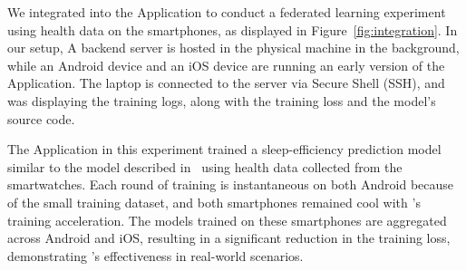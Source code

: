 We integrated \fedkit into the \fedcampus Application to
conduct a federated learning experiment using health data on the smartphones,
as displayed in Figure~\ref{fig:integration}.
In our setup,
A backend server is hosted in the physical machine in the background,
while an Android device and an iOS device are running an early version of
the \fedcampus Application.
The laptop is connected to the server via Secure Shell (SSH),
and was displaying the training logs,
along with the training loss and the model's source code.

The \fedcampus Application in this experiment trained a sleep-efficiency
prediction model similar to the model described in~\cite{khoa2022fedmcrnn}
using health data collected from the smartwatches.
Each round of training is instantaneous on both Android because of
the small training dataset,
and both smartphones remained cool with \fedkit's training acceleration.
The models trained on these smartphones are aggregated across Android and iOS,
resulting in a significant reduction in the training loss,
demonstrating \fedkit's effectiveness in real-world scenarios.
